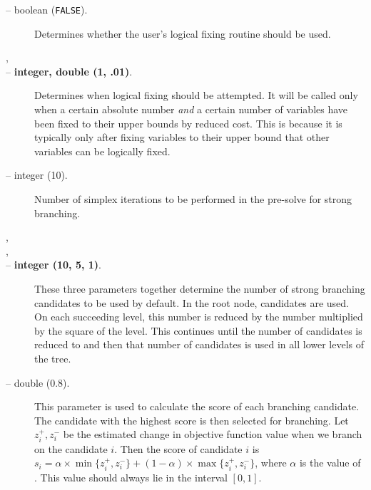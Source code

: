\begin{description}
\item[ -- boolean ({\tt FALSE}).] 
Determines whether the user's logical fixing routine should be used.

\item[,]
\item[ -- 
{\bf integer, double (1, .01)}.]
Determines when logical fixing should be attempted. It will be called
only when a certain absolute number {\em and} a certain number of variables
have been fixed to their upper bounds by reduced cost. This is because
it is typically only after fixing variables to their upper bound that
other variables can be logically fixed.

\label{strong_branching}
\item[ -- integer (10).] 
Number of simplex iterations to be performed in the pre-solve for
strong branching.

\item[,]
\item[,]
\item[ --
{\bf integer (10, 5, 1)}.]
These three parameters together determine the number of strong
branching candidates to be used by default. In the root node,
 candidates are used. On each
succeeding level, this number is reduced by the number 
 multiplied by the square of the level.
This continues until the number of candidates is reduced to 
 and then that number of candidates
is used in all lower levels of the tree.

\item [ -- double (0.8).]
This parameter is used to calculate the score of each branching candidate. The
candidate with the highest score is then selected for branching. Let $z_i^+,
z_i^-$ be the estimated change in objective function value when we branch on
the candidate $i$. Then the score of candidate $i$ is $s_i =
\alpha\times\min\{z_i^+, z_i^-\} + (1-\alpha)\times\max\{z_i^+,z_i^-\}$, where
$\alpha$ is the value of . This
value should always lie in the interval $[0,1]$.


\end{description}

